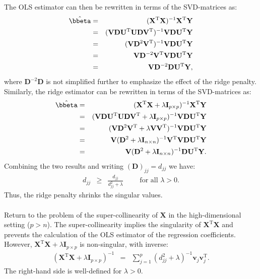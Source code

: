 \documentclass[a4paper]{article}
\theoremstyle{myexamplestyle}
\begin{document}
The OLS estimator can then be rewritten in terms of the SVD-matrices as:
\begin{eqnarray*}
\hat{\bbeta} & = & (\mathbf{X}^{\mathrm{T}} \mathbf{X})^{-1} \mathbf{X}^{\mathrm{T}} \mathbf{Y}
\\
& = & (\mathbf{V} \mathbf{D} \mathbf{U}^{\mathrm{T}} \mathbf{U} \mathbf{D} \mathbf{V}^{\mathrm{T}})^{-1} \mathbf{V} \mathbf{D} \mathbf{U}^{\mathrm{T}} \mathbf{Y}
\\
& = & (\mathbf{V} \mathbf{D}^2 \mathbf{V}^{\mathrm{T}})^{-1} \mathbf{V} \mathbf{D} \mathbf{U}^{\mathrm{T}} \mathbf{Y}
\\
& = & \mathbf{V} \mathbf{D}^{-2} \mathbf{V}^{\mathrm{T}}  \mathbf{V} \mathbf{D} \mathbf{U}^{\mathrm{T}} \mathbf{Y}
\\
& = & \mathbf{V} \mathbf{D}^{-2}  \mathbf{D} \mathbf{U}^{\mathrm{T}} \mathbf{Y},
\end{eqnarray*}
where $\mathbf{D}^{-2}  \mathbf{D}$  is not simplified further to emphasize the effect of the ridge penalty. Similarly, the ridge estimator can be rewritten in terms of the SVD-matrices as: 
\begin{eqnarray*}
\hat{\bbeta} & = & (\mathbf{X}^{\mathrm{T}} \mathbf{X} + \lambda \mathbf{I}_{p \times p})^{-1} \mathbf{X}^{\mathrm{T}} \mathbf{Y}
\\
& = & (\mathbf{V} \mathbf{D} \mathbf{U}^{\mathrm{T}} \mathbf{U} \mathbf{D} \mathbf{V}^{\mathrm{T}}  + \lambda \mathbf{I}_{p \times p})^{-1} \mathbf{V} \mathbf{D} \mathbf{U}^{\mathrm{T}} \mathbf{Y}
\\
& = & (\mathbf{V} \mathbf{D}^2 \mathbf{V}^{\mathrm{T}} + \lambda \mathbf{V}  \mathbf{V}^{\mathrm{T}})^{-1} \mathbf{V} \mathbf{D} \mathbf{U}^{\mathrm{T}} \mathbf{Y}
\\
& = & \mathbf{V} (\mathbf{D}^{2} + \lambda \mathbf{I}_{n \times n})^{-1} \mathbf{V}^{\mathrm{T}}  \mathbf{V} \mathbf{D} \mathbf{U}^{\mathrm{T}} \mathbf{Y}
\\
& = & \mathbf{V} (\mathbf{D}^{2} + \lambda \mathbf{I}_{n \times n})^{-1}  \mathbf{D} \mathbf{U}^{\mathrm{T}} \mathbf{Y}.
\end{eqnarray*}
Combining the two results and writing $(\mathbf{D})_{jj} = d_{jj}$ we have:
\begin{eqnarray*}
d_{jj} & \geq & \frac{d_{jj}}{d_{jj}^2 + \lambda} \qquad \mbox{ for all } \lambda > 0.
\end{eqnarray*}
Thus, the ridge penalty shrinks the singular values.
\\
\\
Return to the problem of the super-collinearity of $\mathbf{X}$ in the high-dimensional setting ($p > n$). The super-collinearity implies the singularity of $\mathbf{X}^{\mathrm{T}} \mathbf{X}$ and prevents the calculation of the OLS estimator of the regression coefficients. However, $\mathbf{X}^{\mathrm{T}} \mathbf{X} + \lambda \mathbf{I}_{p \times p}$ is non-singular, with inverse:
\begin{eqnarray*}
(\mathbf{X}^{\mathrm{T}} \mathbf{X} + \lambda \mathbf{I}_{p \times p})^{-1} & = & \sum_{j=1}^p (d_{jj}^2 + \lambda)^{-1} \mathbf{v}_j \mathbf{v}_j^{\mathrm{T}}.
\end{eqnarray*}
The right-hand side is well-defined for $\lambda > 0$.
\end{document}
